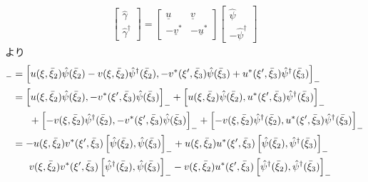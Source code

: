 \documentclass[dvipdfmx, 11pt, a4paper]{jsarticle}
\numberwithin{equation}{section}
\theoremstyle{definition}
\begin{document}
    \begin{derivationBox}
        \begin{align}
            \left[
            \begin{matrix}
                \hat{\gamma}\\
                \hat{\gamma}^\dagger
            \end{matrix}
            \right] = 
            \left[
            \begin{matrix}
                \underline{u}&\underline{v}\\
                -\underline{v}^*&-\underline{u}^*
            \end{matrix}
            \right]
            \left[
            \begin{matrix}
                \hat{\psi}\\
                -\hat{\psi}^\dagger
            \end{matrix}
            \right] 
        \end{align}
        より
        \begin{align}
            [\hat{\gamma}(\xi),\hat{\gamma}^\dagger(\xi')]_{-} &= \left[  u(\xi,\bar{\xi}_2)\hat{\psi}(\bar{\xi}_2)-v(\xi,\bar{\xi}_2)\hat{\psi}^\dagger(\bar{\xi}_2) ,-v^*(\xi',\bar{\xi}_3)\hat{\psi}(\bar{\xi}_3)+ u^*(\xi',\bar{\xi}_3)\hat{\psi}^\dagger(\bar{\xi}_3)\right]_{-} \notag \\
            &= \left[  u(\xi,\bar{\xi}_2)\hat{\psi}(\bar{\xi}_2),-v^*(\xi',\bar{\xi}_3)\hat{\psi}(\bar{\xi}_3)\right]_{-} + \left[  u(\xi,\bar{\xi}_2)\hat{\psi}(\bar{\xi}_2), u^*(\xi',\bar{\xi}_3)\hat{\psi}^\dagger(\bar{\xi}_3)\right]_{-} \notag \\
            &\ \ \ \ \ + \left[  -v(\xi,\bar{\xi}_2)\hat{\psi}^\dagger(\bar{\xi}_2) ,-v^*(\xi',\bar{\xi}_3)\hat{\psi}(\bar{\xi}_3)\right]_{-} + \left[  -v(\xi,\bar{\xi}_2)\hat{\psi}^\dagger(\bar{\xi}_2) , u^*(\xi',\bar{\xi}_3)\hat{\psi}^\dagger(\bar{\xi}_3)\right]_{-} \notag \\
            &= -u(\xi,\bar{\xi}_2)v^*(\xi',\bar{\xi}_3)\left[  \hat{\psi}(\bar{\xi}_2),\hat{\psi}(\bar{\xi}_3)\right]_{-} + u(\xi,\bar{\xi}_2)u^*(\xi',\bar{\xi}_3)\left[  \hat{\psi}(\bar{\xi}_2),\hat{\psi}^\dagger(\bar{\xi}_3)\right]_{-} \notag \\
            &\ \ \ \ \ v(\xi,\bar{\xi}_2)v^*(\xi',\bar{\xi}_3) \left[  \hat{\psi}^\dagger(\bar{\xi}_2) ,\hat{\psi}(\bar{\xi}_3)\right]_{-} -v(\xi,\bar{\xi}_2) u^*(\xi',\bar{\xi}_3) \left[  \hat{\psi}^\dagger(\bar{\xi}_2) , \hat{\psi}^\dagger(\bar{\xi}_3)\right]_{-} \notag \\

\end{align}
\end{derivationBox}
\end{document}
